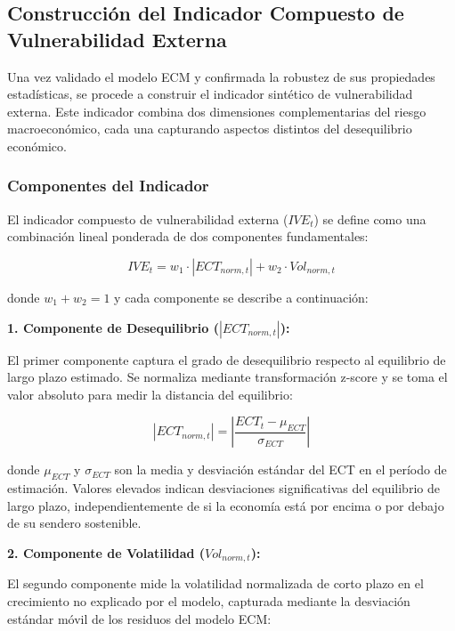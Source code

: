 \documentclass[3p,11pt]{elsarticle}
\begin{document}
\subsection{Construcción del Indicador Compuesto de Vulnerabilidad Externa}

Una vez validado el modelo ECM y confirmada la robustez de sus propiedades estadísticas, se procede a construir el indicador sintético de vulnerabilidad externa. Este indicador combina dos dimensiones complementarias del riesgo macroeconómico, cada una capturando aspectos distintos del desequilibrio económico.

\subsubsection{Componentes del Indicador}

El indicador compuesto de vulnerabilidad externa ($IVE_t$) se define como una combinación lineal ponderada de dos componentes fundamentales:

\begin{equation}
IVE_t = w_1 \cdot |ECT_{norm,t}| + w_2 \cdot Vol_{norm,t}
\label{eq:indicador_compuesto}
\end{equation}

donde $w_1 + w_2 = 1$ y cada componente se describe a continuación:

\textbf{1. Componente de Desequilibrio ($|ECT_{norm,t}|$):}

El primer componente captura el grado de desequilibrio respecto al equilibrio de largo plazo estimado. Se normaliza mediante transformación z-score y se toma el valor absoluto para medir la distancia del equilibrio:

\begin{equation}
|ECT_{norm,t}| = \left|\frac{ECT_t - \mu_{ECT}}{\sigma_{ECT}}\right|
\label{eq:ect_normalizado}
\end{equation}

donde $\mu_{ECT}$ y $\sigma_{ECT}$ son la media y desviación estándar del ECT en el período de estimación. Valores elevados indican desviaciones significativas del equilibrio de largo plazo, independientemente de si la economía está por encima o por debajo de su sendero sostenible.

\textbf{2. Componente de Volatilidad ($Vol_{norm,t}$):}

El segundo componente mide la volatilidad normalizada de corto plazo en el crecimiento no explicado por el modelo, capturada mediante la desviación estándar móvil de los residuos del modelo ECM:
\end{document}
